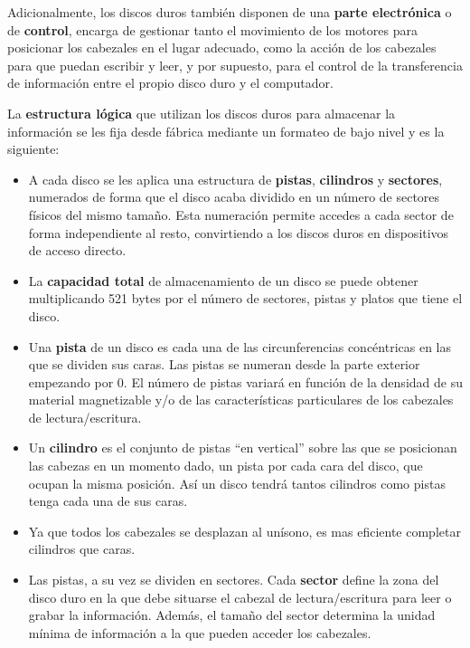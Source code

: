\begin{itemize}
    Adicionalmente, los discos duros también disponen de una \textbf{parte electrónica} o de \textbf{control}, encarga de gestionar tanto el movimiento de los motores para posicionar los cabezales en el lugar adecuado, como la acción de los cabezales para que puedan escribir y leer, y por supuesto, para el control de la transferencia de información entre el propio disco duro y el computador.

    La \textbf{estructura lógica} que utilizan los discos duros para almacenar la información se les fija desde fábrica mediante un formateo de bajo nivel y es la siguiente:

    \begin{itemize}
        \item A cada disco se les aplica una estructura de \textbf{pistas}, \textbf{cilindros} y \textbf{sectores}, numerados de forma que el disco acaba dividido en un número de sectores físicos del mismo tamaño. Esta numeración permite accedes a cada sector de forma independiente al resto, convirtiendo a los discos duros en dispositivos de acceso directo.
        \item La \textbf{capacidad total} de almacenamiento de un disco se puede obtener multiplicando 521 bytes por el número de sectores, pistas y platos que tiene el disco.
        \item Una \textbf{pista} de un disco es cada una de las circunferencias concéntricas en las que se dividen sus caras. Las pistas se numeran desde la parte exterior empezando por 0. El número de pistas variará en función de la densidad de su material magnetizable y/o de las características particulares de los cabezales de lectura/escritura.
        \item Un \textbf{cilindro} es el conjunto de pistas ``en vertical'' sobre las que se posicionan las cabezas en un momento dado, un pista por cada cara del disco, que ocupan la misma posición. Así un disco tendrá tantos cilindros como pistas tenga cada una de sus caras.
        \item Ya que todos los cabezales se desplazan al unísono, es mas eficiente completar cilindros que caras.
        \item Las pistas, a su vez se dividen en sectores. Cada \textbf{sector} define la zona del disco duro en la que debe situarse el cabezal de lectura/escritura para leer o grabar la información. Además, el tamaño del sector determina la unidad mínima de información a la que pueden acceder los cabezales.
    \end{itemize}


\end{itemize}
